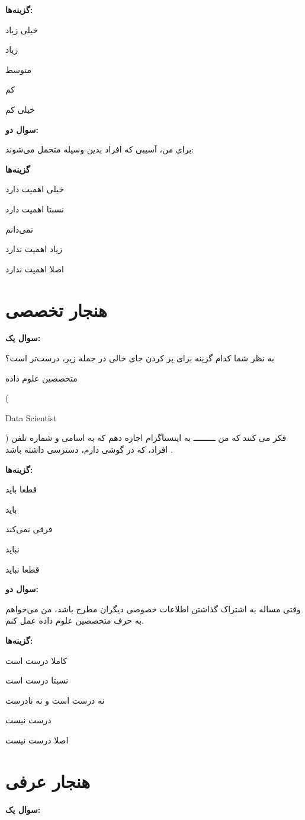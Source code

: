 \textbf{گزینه‌ها:}

خیلی زیاد

زیاد

متوسط

کم

خیلی کم

\textbf{سوال دو:}

برای من، آسیبی که افراد بدین وسیله متحمل می‌شوند: 

\textbf{گزینه‌ها}

خیلی اهمیت دارد

نسبتا اهمیت دارد

نمی‌دانم

زیاد اهمیت ندارد

اصلا اهمیت ندارد

\section*{هنجار تخصصی}

\textbf{سوال یک:}

به نظر شما کدام گزینه برای پر کردن جای خالی در جمله زیر، درست‌تر است؟

متخصصین علوم داده
{(\begin{latin}Data Scientist\end{latin}}
)
 فکر می کنند که من ـــــــــ به اینستاگرام اجازه دهم که به اسامی و شماره تلفن‌ افراد، که در گوشی دارم، دسترسی داشته باشد
\!.


\textbf{گزینه‌ها:}

قطعا باید

باید

فرقی نمی‌کند

نباید

قطعا نباید

\textbf{سوال دو:}

وقتی مساله به اشتراک گذاشتن اطلاعات خصوصی دیگران مطرح باشد، من می‌خواهم به حرف متخصصین علوم داده عمل کنم. 

\textbf{گزینه‌ها:}

کاملا درست است

نسبتا درست است

نه درست است و نه نادرست

درست نیست

اصلا درست نیست

\section*{هنجار عرفی}

\textbf{سوال یک:}

